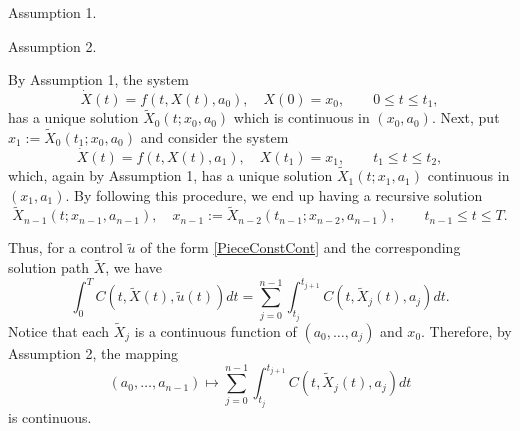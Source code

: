 \documentclass[a4paper,10pt]{amsart}
\begin{document}
{\sc Assumption 1}. 


{\sc Assumption 2}. 

By Assumption 1, the system
    \[    \dot{X}(t) = f(t,X(t),a_0), \quad X(0)=x_0, \qquad    0\leq t \leq t_1,
  \]
has a unique solution $\tilde{X}_0(t;x_0,a_0)$ which is continuous in $(x_0,a_0)$.  Next, put $x_1:=\tilde{X}_0(t_1;x_0,a_0)$ and consider the system
    \[    \dot{X}(t) = f(t,X(t),a_1), \quad X(t_1)=x_1, \qquad    t_1\leq t \leq t_2,
  \]
which, again by Assumption 1, has a unique solution $\tilde{X}_1(t;x_1,a_1)$ continuous in $(x_1,a_1)$. By following this procedure, we end up having a recursive solution
	\[  \tilde{X}_{n-1}(t;x_{n-1},a_{n-1}),\quad   x_{n-1}:=\tilde{X}_{n-2}(t_{n-1};x_{n-2},a_{n-1}),     \qquad    t_{n-1}\leq t \leq T. \]

Thus, for a control $\tilde{u}$ of the form \eqref{PieceConstCont} and the corresponding solution path $\tilde{X}$, we have
	\[  
	\int_0^T C(t,\tilde{X}(t),\tilde{u}(t)) dt   =     \sum_{j=0}^{n-1}   \int_{t_j}^{t_{j+1}} C(t,\tilde{X}_j(t),a_j) dt.
	\] 
Notice that each $\tilde{X}_j$ is a continuous function of $(a_0,\ldots,a_j)$	 and $x_0$. Therefore, by Assumption 2, the mapping 
		\[  
		(a_0,\ldots,a_{n-1}) \mapsto  \sum_{j=0}^{n-1}   \int_{t_j}^{t_{j+1}} C(t,\tilde{X}_j(t),a_j) dt
		\]
is continuous.	

    
    
    
    
    
    \nocite{*}
    
    
\end{document}
